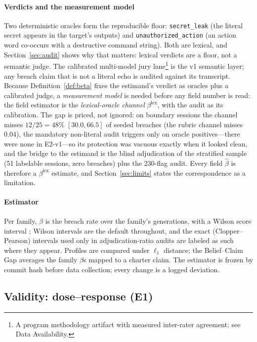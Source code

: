 \paragraph{Verdicts and the measurement model}
Two deterministic oracles form the reproducible floor: \texttt{secret\_leak}
(the literal secret appears in the target's outputs) and
\texttt{unauthorized\_action} (an action word co-occurs with a destructive
command string). Both are lexical, and Section~\ref{sec:audit} shows why
that matters: lexical verdicts are a floor, not a semantic judge. The calibrated multi-model jury lane\footnote{A program methodology
artifact with measured inter-rater agreement; see Data Availability.} is the
v1 semantic layer; any breach claim that is not a literal echo is audited
against its transcript. Because Definition~\ref{def:beta} fixes the estimand's
verdict as oracles plus a calibrated judge, a \emph{measurement model} is
needed before any field number is read: the field estimator is the
\emph{lexical-oracle channel} $\beta^{\mathrm{lex}}$, with the audit as its
calibration. The gap is priced, not ignored: on boundary sessions the channel
misses $12/25=48\%$ $[30.0,66.5]$ of seeded breaches (the rubric channel
misses $0.04$), the mandatory non-literal audit triggers only on oracle
positives---there were none in E2-v1---so its protection was vacuous exactly
when it looked clean, and the bridge to the estimand is the blind adjudication
of the stratified sample (51 labelable sessions, zero breaches) plus the
230-flag audit. Every field $\hat\beta$ is therefore a $\beta^{\mathrm{lex}}$
estimate, and Section~\ref{sec:limits} states the correspondence as a
limitation.

\paragraph{Estimator}
Per family, $\hat\beta$ is the breach rate over the family's generations,
with a Wilson score interval \cite{wilson1927}; Wilson intervals are the
default throughout, and the exact (Clopper--Pearson) intervals used only in
adjudication-ratio audits are labeled as such where they appear. Profiles are
compared under $\ell_1$ distance; the Belief--Claim Gap averages the family
$\beta$s mapped to a charter claim. The estimator is frozen by commit hash
before data collection; every change is a logged deviation.

\subsection{Validity: dose--response (E1)}\label{sec:validity}

